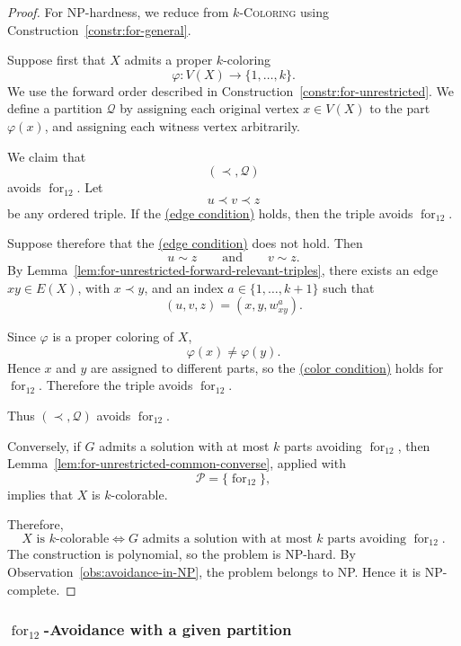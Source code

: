 \documentclass[12pt]{article}
\theoremstyle{plain}
\theoremstyle{definition}
\theoremstyle{remark}
\theoremstyle{definition}
\newcommand{\edgecondition}{%
  \hyperref[def:avoid:cond:edge]{(edge condition)}\xspace
}
\newcommand{\colorcondition}{%
  \hyperref[def:avoid:cond:color]{(color condition)}\xspace
}
\newcommand{\forlabel}{\mathrm{for}}
\DeclareRobustCommand{\forparam}[1]{%
  \ensuremath{\mathop{\forlabel}\nolimits_{#1}}%
}
\begin{document}
\begin{proof}
For NP-hardness, we reduce from \(k\)-\textsc{Coloring} using
Construction~\ref{constr:for-general}.

Suppose first that \(X\) admits a proper \(k\)-coloring
\[
\varphi:V(X)\to\{1,\dots,k\}.
\]
We use the forward order described in
Construction~\ref{constr:for-unrestricted}. We define a partition
\(\mathcal Q\) by assigning each original vertex \(x\in V(X)\) to the
part \(\varphi(x)\), and assigning each witness vertex arbitrarily.

We claim that
\[
(\prec,\mathcal Q)
\]
avoids \(\forparam{12}\). Let
\[
u\prec v\prec z
\]
be any ordered triple. If the \edgecondition{} holds, then the triple
avoids \(\forparam{12}\).

Suppose therefore that the \edgecondition{} does not hold. Then
\[
u\sim z
\qquad\text{and}\qquad
v\sim z.
\]
By Lemma~\ref{lem:for-unrestricted-forward-relevant-triples}, there
exists an edge \(xy\in E(X)\), with \(x\prec y\), and an index
\(a\in\{1,\dots,k+1\}\) such that
\[
(u,v,z)=(x,y,w^a_{xy}).
\]

Since \(\varphi\) is a proper coloring of \(X\),
\[
\varphi(x)\neq\varphi(y).
\]
Hence \(x\) and \(y\) are assigned to different parts, so the
\colorcondition{} holds for \(\forparam{12}\). Therefore the triple
avoids \(\forparam{12}\).

Thus \((\prec,\mathcal Q)\) avoids \(\forparam{12}\).

Conversely, if \(G\) admits a solution with at most \(k\) parts
avoiding \(\forparam{12}\), then
Lemma~\ref{lem:for-unrestricted-common-converse}, applied with
\[
\mathcal P=\{\forparam{12}\},
\]
implies that \(X\) is \(k\)-colorable.

Therefore,
\[
X\text{ is \(k\)-colorable}
\iff
G\text{ admits a solution with at most \(k\) parts avoiding }
\forparam{12}.
\]
The construction is polynomial, so the problem is NP-hard.
By Observation~\ref{obs:avoidance-in-NP}, the problem belongs to NP.
Hence it is NP-complete.
\end{proof}




\subsubsection{
\texorpdfstring{\(\forparam{12}\)-Avoidance with a given partition}
{for12-Avoidance with a given partition}
}
\label{subsubsec:for12-given-partition}
\end{document}
